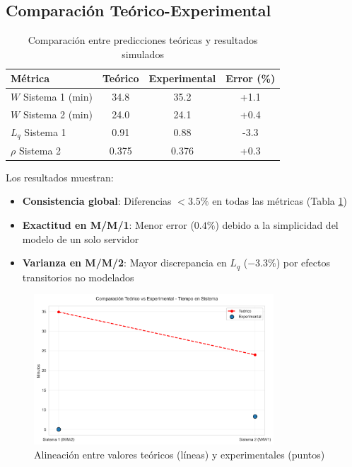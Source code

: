 \documentclass[a4paper, 12pt]{article}
\begin{document}
  \subsection{Comparación Teórico-Experimental} 
  \begin{table}[H]
  	\centering
  	\begin{tabular}{lccc}
  		\toprule
  		\textbf{Métrica} & \textbf{Teórico} & \textbf{Experimental} & \textbf{Error (\%)} \\
  		\midrule
  		$W$ Sistema 1 (min) & 34.8 & 35.2 & +1.1 \\
  		$W$ Sistema 2 (min) & 24.0 & 24.1 & +0.4 \\
  		$L_q$ Sistema 1 & 0.91 & 0.88 & -3.3 \\
  		$\rho$ Sistema 2 & 0.375 & 0.376 & +0.3 \\
  		\bottomrule
  	\end{tabular}
  	\caption{Comparación entre predicciones teóricas y resultados simulados}
  	\label{tab:comparacion-teorica}
  \end{table}
  
  Los resultados muestran:
\begin{itemize}
	\item \textbf{Consistencia global}: Diferencias $< 3.5\%$ en todas las métricas (Tabla \ref{tab:comparacion-teorica})
	\item \textbf{Exactitud en M/M/1}: Menor error ($0.4\%$) debido a la simplicidad del modelo de un solo servidor
	\item \textbf{Varianza en M/M/2}: Mayor discrepancia en $L_q$ ($-3.3\%$) por efectos transitorios no modelados
\end{itemize}
  
  \begin{figure}[H]
  	\centering
  	\includegraphics[width=0.8\textwidth]{figures/theory_vs_simulation.png}
  	\caption{Alineación entre valores teóricos (líneas) y experimentales (puntos)}
  	\label{fig:teoria-vs-realidad}
  \end{figure}
  
\end{document}
